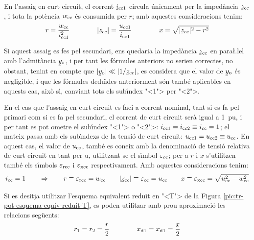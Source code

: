 En l'assaig en curt circuit, el corrent $\cmplx{i}\ped{cc1}$ circula
\'{u}nicament per la imped\`{a}ncia $\cmplx{z}\ped{cc}$, i tota la pot\`{e}ncia
$w_\mathrm{cc}$ \'{e}s consumida per $r$; amb aquestes consideracions tenim:
\begin{equation}
    r = \frac{w\ped{cc}}{i\ped{cc1}^2} \qquad\qquad
    |\cmplx{z}\ped{cc}| = \frac{u\ped{cc1}}{i\ped{cc1}} \qquad\qquad
    x = \sqrt{|\cmplx{z}\ped{cc}|^2 - r^2}
\end{equation}

Si aquest assaig es fes pel secundari, ens quedaria la imped\`{a}ncia
$\cmplx{z}\ped{cc}$ en para{\l.l}el amb l'admit\`{a}ncia
$\cmplx{y}\ped{o}$, i per tant les f\'{o}rmules anteriors no serien
correctes, no obstant, tenint en compte que $|\cmplx{y}\ped{o}| \ll
|1/\cmplx{z}\ped{cc}|$, es considera que el valor de
$\cmplx{y}\ped{o}$ \'{e}s negligible, i que les f\'{o}rmules dedu\"{\i}des
anteriorment s\'{o}n tamb\'{e} aplicables en aquests cas, aix\`{o} s\'{\i}, canviant
tots els sub\'{\i}ndex {"<}1{">} per {"<}2{">}.

En el cas que l'assaig en curt circuit es faci a corrent nominal,
tant  si es fa pel primari  com si es fa pel secundari, el corrent
de curt circuit ser\`{a} igual a \SI{1}{pu}, i per tant es pot ometre el
sub\'{\i}ndex {"<}1{">} o {"<}2{">}: $i_\mathrm{cc1} = i_\mathrm{cc2} \equiv i_\mathrm{cc} = 1$;
el mateix passa amb els sub\'{\i}ndexs de la tensi\'{o} de curt circuit:
$u_\mathrm{cc1} = u_\mathrm{cc2} \equiv u_\mathrm{cc}$. En aquest cas, el valor
de $u_\mathrm{cc}$, tamb\'{e} es coneix amb la denominaci\'{o} de
tensi\'{o} relativa de curt  circuit en tant per u, utilitzant-se  el
s\'{\i}mbol $\varepsilon_\mathrm{cc}$; per a $r$ i $x$ s'utilitzen tamb\'{e} els
s\'{\i}mbols $\varepsilon_\mathrm{rcc}$ i $\varepsilon_\mathrm{xcc}$
respectivament. Amb aquestes consideracions tenim:
\begin{equation}
    i\ped{cc} = 1 \qquad \Rightarrow \qquad r \equiv \varepsilon\ped{rcc} = w\ped{cc} \qquad
    |\cmplx{z}\ped{cc}| \equiv \varepsilon\ped{cc} = u\ped{cc} \qquad
    x \equiv \varepsilon\ped{xcc} = \sqrt{u\ped{cc}^2 - w\ped{cc}^2}
    \label{eq:assaig-cc-nomianl}
\end{equation}

Si es desitja utilitzar l'esquema equivalent redu\"{\i}t en {"<}T{">} de la Figura \vref{pic:tr-pot-esquema-equiv-reduit-T}, es poden utilitzar amb prou aproximaci\'{o} les relacions seg\"{u}ents:
\begin{equation}
    r_1 = r_2 = \frac{r}{2} \qquad\qquad x_\mathrm{d1} = x_\mathrm{d1} = \frac{x}{2}
\end{equation}


